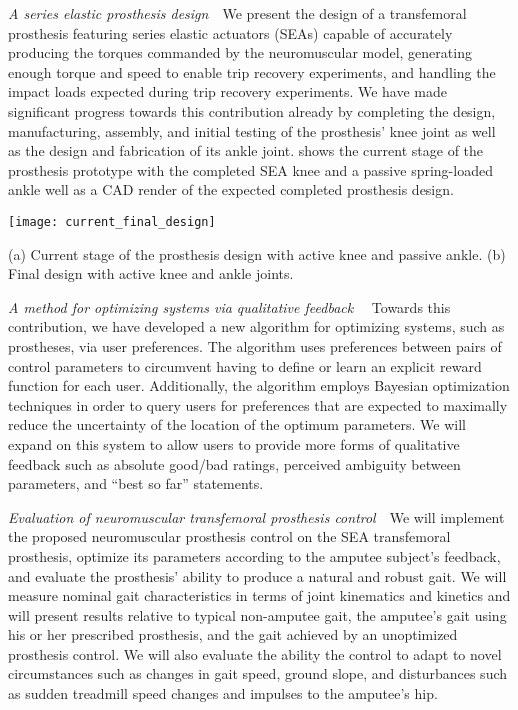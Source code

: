\begin{contributions}
    \item\label{contrib:pros_design} \emph{A series elastic prosthesis
    design}~~We present the design of a transfemoral prosthesis featuring series
    elastic actuators (SEAs) capable of accurately producing the torques
    commanded by the neuromuscular model, generating enough torque and speed to
    enable trip recovery experiments, and handling the impact loads expected
    during trip recovery experiments. We have made significant progress towards
    this contribution already by completing the design, manufacturing, assembly,
    and initial testing of the prosthesis' knee joint as well as the design and
    fabrication of its ankle joint.   shows the
    current stage of the prosthesis prototype with the completed SEA knee and a
    passive spring-loaded ankle well as a CAD render of the expected completed
    prosthesis design.
    \begin{marginfigure}[1in]
        \centering
        \texttt{[image: current\_final\_design]}
        \caption{(a) Current stage of the prosthesis design with active knee and
        passive ankle. (b) Final design with active knee and ankle joints.}
        \label{fig:prosthesis_design}
    \end{marginfigure}

    \item\label{contrib:pref_opt} \emph{A method for optimizing systems via
    qualitative feedback}~~ Towards this contribution, we have developed a new
    algorithm for optimizing systems, such as prostheses, via user preferences.
    The algorithm uses preferences between pairs of control parameters to
    circumvent having to define or learn an explicit reward function for each
    user. Additionally, the algorithm employs Bayesian optimization techniques
    in order to query users for preferences that are expected to maximally
    reduce the uncertainty of the location of the optimum parameters. We will
    expand on this system to allow users to provide more forms of qualitative
    feedback such as absolute good/bad ratings, perceived ambiguity between
    parameters, and ``best so far'' statements.

    \item\label{contrib:neuromuc_eval} \emph{Evaluation of neuromuscular
    transfemoral prosthesis control}~~We will implement the proposed
    neuromuscular prosthesis control on the SEA transfemoral prosthesis,
    optimize its parameters according to the amputee subject's feedback, and
    evaluate the prosthesis' ability to produce a natural and robust gait. We
    will measure nominal gait characteristics in terms of joint kinematics and
    kinetics and will present results relative to typical non-amputee gait, the
    amputee's gait using his or her prescribed prosthesis, and the gait achieved
    by an unoptimized prosthesis control. We will also evaluate the ability the
    control to adapt to novel circumstances such as changes in gait speed,
    ground slope, and disturbances such as sudden treadmill speed changes and
    impulses to the amputee's hip.


\end{contributions}
